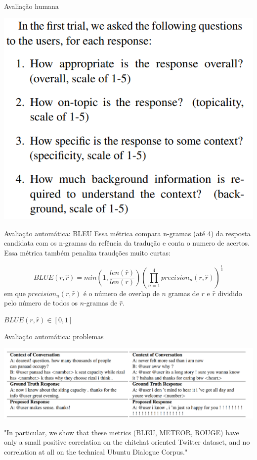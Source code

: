\documentclass[10pt]{beamer}
\begin{document}
\begin{frame}{Avaliação humana \cite{Lowe:2016}}
\begin{center}
\includegraphics[scale=0.4]{images/exemploEval1.png}
\end{center}
\end{frame}




\begin{frame}{Avaliação automática: BLEU \cite{Papineni2001}}
Essa métrica compara n-gramas (até 4) da resposta candidata com os n-gramas da refência da tradução e conta o numero de acertos. Essa métrica também penaliza traudções muito curtas:

\begin{equation}
BLUE(r, \hat{r}) = min \left(1, \frac{len(\hat{r})}{len(r)} \right) \left(\prod_{n=1}^{4} precision_{n}(r, \hat{r}) \right)^{\frac{1}{4}}
\end{equation}
em que $ precision_{n}(r, \hat{r})$ é o número de overlap de $n$ gramas de $r$ e $\hat{r}$ dividido pelo número de todos os $n$-gramas de $\hat{r}$. 

$BLUE(r, \hat{r}) \in [0,1]$

\end{frame}


\begin{frame}{Avaliação automática: problemas}
\begin{center}
\includegraphics[scale=0.23]{images/weak_corr.png}
\end{center}

"In particular, we show that these metrics (BLEU, METEOR, ROUGE) have only a small positive correlation on the chitchat oriented Twitter dataset, and no correlation at all on the technical Ubuntu Dialogue Corpus." \cite{LiuLSNCP16}

\end{frame}
\end{document}
